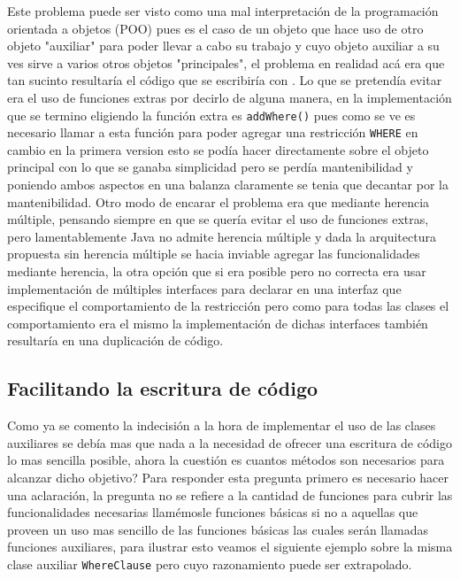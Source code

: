 Este problema puede ser visto como una mal interpretación de la programación orientada a objetos (POO) pues es el caso de un objeto que hace uso de otro objeto "auxiliar" para poder llevar a cabo su trabajo y cuyo objeto auxiliar a su ves sirve a varios otros objetos "principales", el problema en realidad acá era que tan sucinto resultaría el código que se escribiría con \jj. Lo que se pretendía evitar era el uso de funciones extras por decirlo de alguna manera, en la implementación que se termino eligiendo la función extra es \verb=addWhere()= pues como se ve es necesario llamar a esta función para poder agregar una restricción \verb=WHERE= en cambio en la primera version esto se podía hacer directamente sobre el objeto principal con lo que se ganaba simplicidad pero se perdía mantenibilidad y poniendo ambos aspectos en una balanza claramente se tenia que decantar por la mantenibilidad. Otro modo de encarar el problema era que mediante herencia múltiple, pensando siempre en que se quería evitar el uso de funciones extras, pero lamentablemente Java no admite herencia múltiple\cite{java:jdbc:tutorial} y dada la arquitectura propuesta sin herencia múltiple se hacia inviable agregar las funcionalidades mediante herencia, la otra opción que si era posible pero no correcta era usar implementación de múltiples interfaces para declarar en una interfaz que especifique el comportamiento de la restricción pero como para todas las clases el comportamiento era el mismo la implementación de dichas interfaces también resultaría en una duplicación de código.
%
\subsection{Facilitando la escritura de código}
\label{implementacion:manejador:facilitando}
Como ya se comento la indecisión a la hora de implementar el uso de las clases auxiliares se debía mas que nada a la necesidad de ofrecer una escritura de código lo mas sencilla posible, ahora la cuestión es cuantos métodos son necesarios para alcanzar dicho objetivo? Para responder esta pregunta primero es necesario hacer una aclaración, la pregunta no se refiere a la cantidad de funciones para cubrir las funcionalidades necesarias llamémosle funciones básicas si no a aquellas que proveen un uso mas sencillo de las funciones básicas las cuales serán llamadas funciones auxiliares, para ilustrar esto veamos el siguiente ejemplo sobre la misma clase auxiliar \verb=WhereClause= pero cuyo razonamiento puede ser extrapolado.

